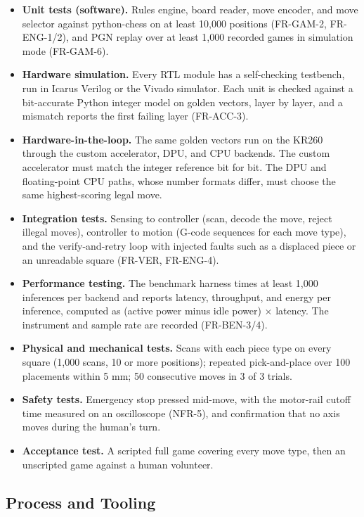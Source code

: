 \documentclass[10pt]{article}
\newcommand{\lead}[1]{\textbf{#1}}
\begin{document}
\begin{itemize}
\item \lead{Unit tests (software).} Rules engine, board reader, move encoder, and move selector
  against python-chess on at least 10,000 positions (FR-GAM-2, FR-ENG-1/2), and PGN replay over at
  least 1,000 recorded games in simulation mode (FR-GAM-6).
\item \lead{Hardware simulation.} Every RTL module has a self-checking testbench, run in Icarus
  Verilog or the Vivado simulator. Each unit is checked against a bit-accurate Python integer model
  on golden vectors, layer by layer, and a mismatch reports the first failing layer (FR-ACC-3).
\item \lead{Hardware-in-the-loop.} The same golden vectors run on the KR260 through the custom
  accelerator, DPU, and CPU backends. The custom accelerator must match the integer reference bit
  for bit. The DPU and floating-point CPU paths, whose number formats differ, must choose the same
  highest-scoring legal move.
\item \lead{Integration tests.} Sensing to controller (scan, decode the move, reject illegal
  moves), controller to motion (G-code sequences for each move type), and the verify-and-retry loop
  with injected faults such as a displaced piece or an unreadable square (FR-VER, FR-ENG-4).
\item \lead{Performance testing.} The benchmark harness times at least 1,000 inferences per backend
  and reports latency, throughput, and energy per inference, computed as (active power minus idle
  power) $\times$ latency. The instrument and sample rate are recorded (FR-BEN-3/4).
\item \lead{Physical and mechanical tests.} Scans with each piece type on every square (1,000
  scans, 10 or more positions); repeated pick-and-place over 100 placements within 5 mm; 50
  consecutive moves in 3 of 3 trials.
\item \lead{Safety tests.} Emergency stop pressed mid-move, with the motor-rail cutoff time
  measured on an oscilloscope (NFR-5), and confirmation that no axis moves during the human's turn.
\item \lead{Acceptance test.} A scripted full game covering every move type, then an unscripted
  game against a human volunteer.
\end{itemize}

\subsection{Process and Tooling}
\end{document}
